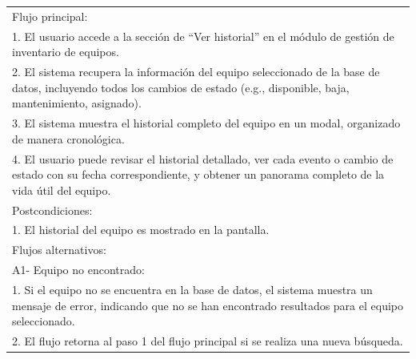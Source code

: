 \documentclass[stu, 12pt, letterpaper, donotrepeattitle, floatsintext, natbib]{apa7}
\begin{document}
\begin{longtable}{@{} p{16.5cm} @{}}
    Flujo principal:                                                                                                                                                                       \\
    1. El usuario accede a la secci\'on de ``Ver historial'' en el m\'odulo de gesti\'on de inventario de equipos.                                                                         \\
    2. El sistema recupera la informaci\'on del equipo seleccionado de la base de datos, incluyendo todos los cambios de estado (e.g., disponible, baja, mantenimiento, asignado).         \\
    3. El sistema muestra el historial completo del equipo en un modal, organizado de manera cronol\'ogica.                                                                                \\
    4. El usuario puede revisar el historial detallado, ver cada evento o cambio de estado con su fecha correspondiente, y obtener un panorama completo de la vida \'util del equipo.      \\ \midrule
    Postcondiciones:                                                                                                                                                                       \\
    1. El historial del equipo es mostrado en la pantalla.                                                                                                                                 \\ \midrule
    Flujos alternativos:                                                                                                                                                                   \\
    A1- Equipo no encontrado:                                                                                                                                                              \\
    \hspace{1cm}1. Si el equipo no se encuentra en la base de datos, el sistema muestra un mensaje de error, indicando que no se han encontrado resultados para el equipo seleccionado.    \\
    \hspace{1cm}2. El flujo retorna al paso 1 del flujo principal si se realiza una nueva b\'usqueda.                                                                                      \\

\end{longtable}
\end{document}
